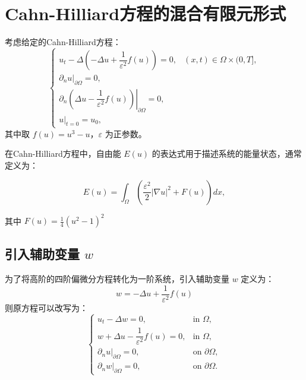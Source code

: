 \documentclass[12pt,a4paper]{article}
\begin{document}
	
	\section{Cahn-Hilliard方程的混合有限元形式}
	
	考虑给定的Cahn-Hilliard方程：
	\begin{equation}
		\begin{cases}
			u_t - \Delta\left(-\Delta u + \dfrac{1}{\varepsilon^2} f(u)\right) = 0, & (x, t) \in \Omega \times (0, T], \\
			\left.\partial_n u\right|_{\partial \Omega} = 0, \\
			\left.\partial_n\left(\Delta u - \dfrac{1}{\varepsilon^2} f(u)\right)\right|_{\partial \Omega} = 0, \\
			u|_{t=0} = u_0,
		\end{cases}
	\end{equation}
	其中取 \( f(u) = u^3 - u \)，\( \varepsilon \) 为正参数。
	
	在Cahn-Hilliard方程中，自由能 \( E(u) \) 的表达式用于描述系统的能量状态，通常定义为：
	
	\begin{equation}
		E(u) = \int_{\Omega} \left( \frac{\varepsilon^2}{2} |\nabla u|^2 + F(u) \right) dx,
	\end{equation}
	
	其中 \( F(u) = \frac{1}{4}(u^2 - 1)^2 \)
	
	\subsection{引入辅助变量 \( w \)}
	
	为了将高阶的四阶偏微分方程转化为一阶系统，引入辅助变量 \( w \) 定义为：
	\begin{equation}
		w = -\Delta u + \dfrac{1}{\varepsilon^2} f(u)
	\end{equation}
	则原方程可以改写为：
	\begin{equation}
		\begin{cases}
			u_t - \Delta w = 0, & \text{in } \Omega, \\
			w + \Delta u - \dfrac{1}{\varepsilon^2} f(u) = 0, & \text{in } \Omega, \\
			\left.\partial_n u \right|_{\partial \Omega} = 0, & \text{on } \partial \Omega, \\
			\left.\partial_n w \right|_{\partial \Omega} = 0, & \text{on } \partial \Omega.
		\end{cases}
	\end{equation}
\end{document}

